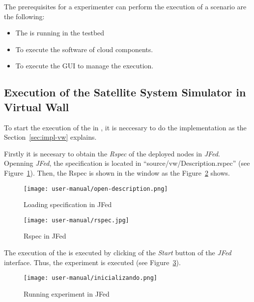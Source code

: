 The prerequisites for a experimenter can perform the execution of a scenario are
the following:
\begin{itemize}
\item The \sss is running in the \vw testbed
\item To execute the software of cloud components. 
\item To execute the \ac{GUI} to manage the execution.
\end{itemize}

\subsection{Execution of the Satellite System Simulator in Virtual Wall}

To start the execution of the \sss in \vw, it is neccesary to do the
implementation as the Section~\ref{sec:impl-vw} explains.

Firstly it is necesary to obtain the \emph{Rspec} of the deployed nodes in
\emph{JFed}. Openning \emph{JFed}, the specification is located in
``source/vw/Description.rspec'' (see Figure~\ref{fig:loading-rspec}). Then, the Rspec is shown in
the window as the Figure~\ref{fig:rspec} shows.

\begin{figure}[!h]
\begin{center}
\texttt{[image: user-manual/open-description.png]}
\caption{Loading specification in JFed}
\label{fig:loading-rspec}
\end{center}
\end{figure}


\begin{figure}[!h]
\begin{center}
\texttt{[image: user-manual/rspec.jpg]}
\caption{Rspec in JFed}
\label{fig:rspec}
\end{center}
\end{figure}


The execution of the \sss is executed by clicking of the \emph{Start} button of
the \emph{JFed} interface. Thus, the experiment is executed (see Figure~\ref{fig:running-jfed}).

\begin{figure}[!h]
\begin{center}
\texttt{[image: user-manual/inicializando.png]}
\caption{Running experiment in JFed}
\label{fig:running-jfed}
\end{center}
\end{figure}


